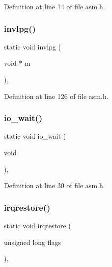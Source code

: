 Definition at line 14 of file asm.\+h.

\mbox{\label{a00014_a20faed26baa341152aa32288418f1457_a20faed26baa341152aa32288418f1457}} 
\subsubsection{\texorpdfstring{invlpg()}{invlpg()}}
{\footnotesize\ttfamily static void invlpg (\begin{DoxyParamCaption}\item[{void $\ast$}]{m }\end{DoxyParamCaption})\hspace{0.3cm}{\ttfamily [inline]}, {\ttfamily [static]}}



Definition at line 126 of file asm.\+h.

\mbox{\label{a00014_a488d1b3600792ee3aac5be4b7e0be16b_a488d1b3600792ee3aac5be4b7e0be16b}} 
\subsubsection{\texorpdfstring{io\+\_\+wait()}{io\_wait()}}
{\footnotesize\ttfamily static void io\+\_\+wait (\begin{DoxyParamCaption}\item[{void}]{ }\end{DoxyParamCaption})\hspace{0.3cm}{\ttfamily [inline]}, {\ttfamily [static]}}



Definition at line 30 of file asm.\+h.

\mbox{\label{a00014_a7dd6b2cd918b8cbca3c8b0381628ca83_a7dd6b2cd918b8cbca3c8b0381628ca83}} 
\subsubsection{\texorpdfstring{irqrestore()}{irqrestore()}}
{\footnotesize\ttfamily static void irqrestore (\begin{DoxyParamCaption}\item[{unsigned long}]{flags }\end{DoxyParamCaption})\hspace{0.3cm}{\ttfamily [inline]}, {\ttfamily [static]}}



